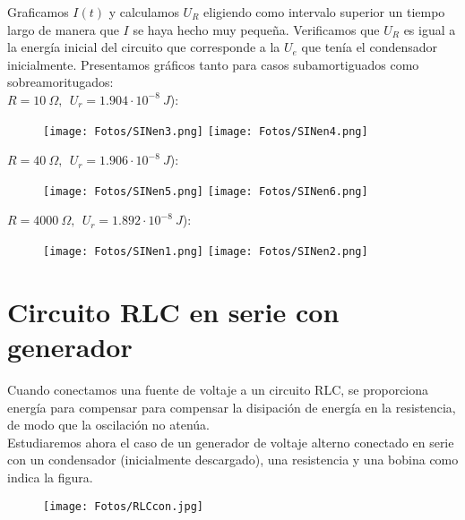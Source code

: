 \documentclass{article}
\begin{document}
        Graficamos $I(t)$ y calculamos $U_R$ eligiendo como intervalo superior un tiempo largo de manera que $I$ se haya hecho muy pequeña. Verificamos que $U_R$ es igual a la energía inicial del circuito que corresponde a la $U_e$ que tenía el condensador inicialmente. Presentamos gráficos tanto para casos subamortiguados como sobreamoritugados:\\ 
        
        $R = 10\ \Omega ,\ \ U_{r} = 1.904\cdot10^{-8}\ J$):
        
        \begin{figure}[h]
            \centering
            \texttt{[image: Fotos/SINen3.png]}
            \texttt{[image: Fotos/SINen4.png]}
        \end{figure}
        
        $R = 40\ \Omega ,\ \ U_{r} = 1.906\cdot10^{-8}\ J$):
        
        \begin{figure}[h]
            \centering
            \texttt{[image: Fotos/SINen5.png]}
            \texttt{[image: Fotos/SINen6.png]}
        \end{figure}
        
        $R = 4000\ \Omega ,\ \ U_{r} = 1.892\cdot10^{-8}\ J$):
        
        \begin{figure}[h]
            \centering
            \texttt{[image: Fotos/SINen1.png]}
            \texttt{[image: Fotos/SINen2.png]}
        \end{figure}

\clearpage

\section{Circuito RLC en serie con generador}
    Cuando conectamos una fuente de voltaje a un circuito RLC, se proporciona energía para compensar para compensar la disipación de energía en la resistencia, de modo que la oscilación no atenúa.\\
    
    Estudiaremos ahora el caso de un generador de voltaje alterno conectado en serie con un condensador (inicialmente descargado), una resistencia y una bobina como indica la figura. 
    
    \begin{figure}[h]
        \centering
        \texttt{[image: Fotos/RLCcon.jpg]}
    \end{figure}
    
\end{document}
